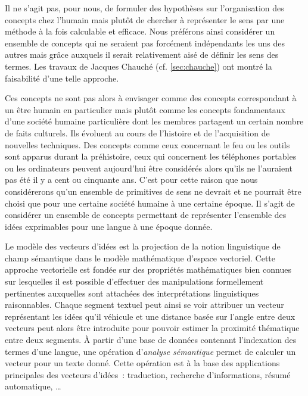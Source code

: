 {Il ne s'agit pas, pour nous, de formuler des hypothèses sur
l'organisation des concepts chez l'humain mais plutôt de chercher à
représenter le sens par une méthode à la fois calculable et efficace.
Nous préférons ainsi considérer un ensemble de concepts qui ne
seraient pas forcément indépendants les uns des autres mais grâce
auxquels il serait relativement aisé de définir les sens des termes.
Les travaux de Jacques Chauché (cf.  \ref{sec:chauche}) ont montré la
faisabilité d'une telle approche.

Ces concepts ne sont pas alors à envisager comme des concepts
correspondant à un être humain en particulier mais plutôt comme les
concepts fondamentaux d'une société humaine particulière dont les
membres partagent un certain nombre de faits culturels. Ils évoluent
au cours de l'histoire et de l'acquisition de nouvelles techniques.
Des concepts comme ceux concernant le feu ou les outils sont apparus
durant la préhistoire, ceux qui concernent les téléphones portables ou
les ordinateurs peuvent aujourd'hui être considérés alors qu'ils ne
l'auraient pas été il y a cent ou cinquante ans.  C'est pour cette
raison que nous considérerons qu'un ensemble de primitives de sens ne
devrait et ne pourrait être choisi que pour une certaine société
humaine à une certaine époque. Il s'agit de considérer un ensemble de
concepts permettant de représenter l'ensemble des idées exprimables
pour une langue à une époque donnée.

Le modèle des vecteurs d'idées est la projection de la
notion linguistique de champ sémantique dans
le modèle mathématique d'espace vectoriel. 
Cette approche vectorielle est fondée sur des propriétés mathématiques
bien connues sur lesquelles il est possible d'effectuer des
manipulations formellement pertinentes auxquelles sont attachées des
interprétations linguistiques raisonnables. Chaque segment textuel
peut ainsi se voir attribuer un vecteur représentant les idées qu'il
véhicule et une distance basée sur l'angle entre deux vecteurs peut
alors être introduite pour pouvoir estimer la proximité
thématique entre deux segments. À partir
d'une base de données contenant l'indexation des termes d'une langue,
une opération d'\emph{analyse sémantique}
permet de calculer un vecteur pour un texte donné. Cette opération est
à la base des applications principales des vecteurs d'idées~:
traduction, recherche d'informations, résumé automatique,
\ldots{}

}
